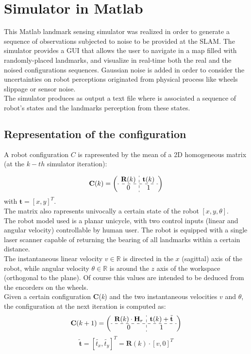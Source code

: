\section{Simulator in Matlab}\label{sec:matlab_simulator}

This Matlab landmark sensing simulator was realized in order to generate a sequence of observations subjected to noise to be provided at the SLAM.
The simulator provides a GUI that allows the user to navigate in a map filled with randomly-placed landmarks, and visualize in real-time both the real 
and the noised configurations sequences. Gaussian noise is added in order to consider the uncertainties on robot perceptions originated from physical process
like wheels slippage or sensor noise.\\
The simulator produces as output a text file where is associated a sequence of robot's states and the landmarks perception from these states.

\subsection{Representation of the configuration}
A robot configuration $C$ is rapresented by the mean of a 2D homogeneous matrix (at the $k-th$ simulator iteration):

\[ 
\textbf{C}(k) = 
\left( \begin{array}{c:c}
  \textbf{R}(k)  & \textbf{t}(k) \\ \hdashline
  0 & 1  \\
\end{array} \right)
\]
with $\textbf{t} = [x,y]^T$.\\
The matrix also rapresents univocally a certain state of the robot $[x,y,\theta]$.
\\
The robot model used is a planar unicycle, with two control inputs (linear and angular velocity) controllable by human user.
The robot is equipped with a single laser scanner capable of returning the bearing of all landmarks within a certain distance.\\
The instantaneous linear velocity $v \in \mathbb{R}$ is directed in the $x$ (sagittal) axis of the robot, while angular velocity $\theta \in \mathbb{R}$ is
around the $z$ axis of the workspace (orthogonal to the plane). Of course this values are intended to be deduced from the encorders on the wheels.\\
Given a certain configuration $\textbf{C}$(\textit{k}) and the two instantaneous velocities $v$ and $\theta$, the configuration at the next iteration is computed as:\\
\[ 
\textbf{C}(k+1) = 
\left( \begin{array}{c:c}
  \textbf{R}(k) \cdot \textbf{H}_r & \textbf{t}(k) + \tilde{\textbf{t}} \\ \hdashline
  0 & 1  \\
\end{array} \right)
\]
\[ 
\tilde{\textbf{t}} = [\tilde{t_x},\tilde{t_y}]^T = \textbf{R}(k) \cdot [v,0]^T
\]

